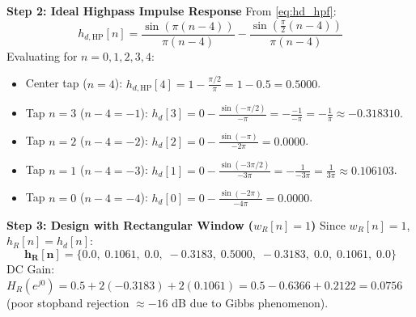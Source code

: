 \documentclass[11pt,a4paper]{article}
\begin{document}
\vspace{1mm}
\noindent\textbf{Step 2: Ideal Highpass Impulse Response}
From \eqref{eq:hd_hpf}:
\begin{equation}
h_{d,\text{HP}}[n] = \frac{\sin(\pi(n - 4))}{\pi(n - 4)} - \frac{\sin\left(\frac{\pi}{2}(n - 4)\right)}{\pi(n - 4)}
\end{equation}
Evaluating for $n = 0, 1, 2, 3, 4$:
\begin{itemize}
    \item Center tap ($n = 4$): $h_{d,\text{HP}}[4] = 1 - \frac{\pi/2}{\pi} = 1 - 0.5 = \mathbf{0.5000}$.
    \item Tap $n = 3$ ($n - 4 = -1$): $h_d[3] = 0 - \frac{\sin(-\pi/2)}{-\pi} = -\frac{-1}{-\pi} = -\frac{1}{\pi} \approx \mathbf{-0.318310}$.
    \item Tap $n = 2$ ($n - 4 = -2$): $h_d[2] = 0 - \frac{\sin(-\pi)}{-2\pi} = \mathbf{0.0000}$.
    \item Tap $n = 1$ ($n - 4 = -3$): $h_d[1] = 0 - \frac{\sin(-3\pi/2)}{-3\pi} = -\frac{1}{-3\pi} = \frac{1}{3\pi} \approx \mathbf{0.106103}$.
    \item Tap $n = 0$ ($n - 4 = -4$): $h_d[0] = 0 - \frac{\sin(-2\pi)}{-4\pi} = \mathbf{0.0000}$.
\end{itemize}

\vspace{1mm}
\noindent\textbf{Step 3: Design with Rectangular Window ($w_R[n] = 1$)}
Since $w_R[n] = 1$, $h_R[n] = h_d[n]$:
\begin{equation}
\mathbf{h_R[n] = \{0.0, \; 0.1061, \; 0.0, \; -0.3183, \; 0.5000, \; -0.3183, \; 0.0, \; 0.1061, \; 0.0\}}
\end{equation}
DC Gain: $H_R(e^{j0}) = 0.5 + 2(-0.3183) + 2(0.1061) = 0.5 - 0.6366 + 0.2122 = \mathbf{0.0756}$ (poor stopband rejection $\approx -16$ dB due to Gibbs phenomenon).
\end{document}
